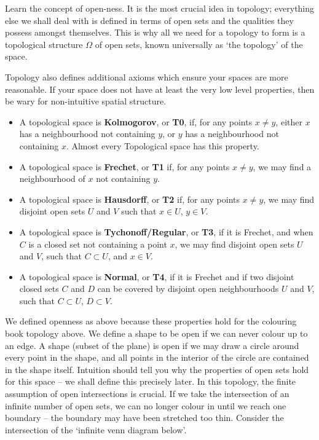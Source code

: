 Learn the concept of open-ness. It is the most crucial idea in topology; everything else we shall deal with is defined in terms of open sets and the qualities they possess amongst themselves. This is why all we need for a topology to form is a topological structure $\Omega$ of open sets, known universally as `the topology' of the space.

Topology also defines additional axioms which ensure your spaces are more reasonable. If your space does not have at least the very low level properties, then be wary for non-intuitive spatial structure.

\begin{itemize}
    \item A topological space is {\bf Kolmogorov}, or {\bf T0}, if, for any points $x \neq y$, either $x$ has a neighbourhood not containing $y$, or $y$ has a neighbourhood not containing $x$. Almost every Topological space has this property.
    \item A topological space is {\bf Frechet}, or {\bf T1} if, for any points $x \neq y$, we may find a neighbourhood of $x$ not containing $y$.
    \item A topological space is {\bf Hausdorff}, or {\bf T2} if, for any points $x \neq y$, we may find disjoint open sets $U$ and $V$ such that $x \in U$, $y \in V$.
    \item A topological space is {\bf Tychonoff/Regular}, or {\bf T3}, if it is Frechet, and when $C$ is a closed set not containing a point $x$, we may find disjoint open sets $U$ and $V$, such that $C \subset U$, and $x \in V$.
    \item A topological space is {\bf Normal}, or {\bf T4}, if it is Frechet and if two disjoint closed sets $C$ and $D$ can be covered by disjoint open neighbourhoods $U$ and $V$, such that $C \subset U$, $D \subset V$.
\end{itemize}

We defined openness as above because these properties hold for the colouring book topology above. We define a shape to be open if we can never colour up to an edge. A shape (subset of the plane) is open if we may draw a circle around every point in the shape, and all points in the interior of the circle are contained in the shape itself. Intuition should tell you why the properties of open sets hold for this space -- we shall define this precisely later. In this topology, the finite assumption of open intersections is crucial. If we take the intersection of an infinite number of open sets, we can no longer colour in until we reach one boundary -- the boundary may have been stretched too thin. Consider the intersection of the `infinite venn diagram below'.

